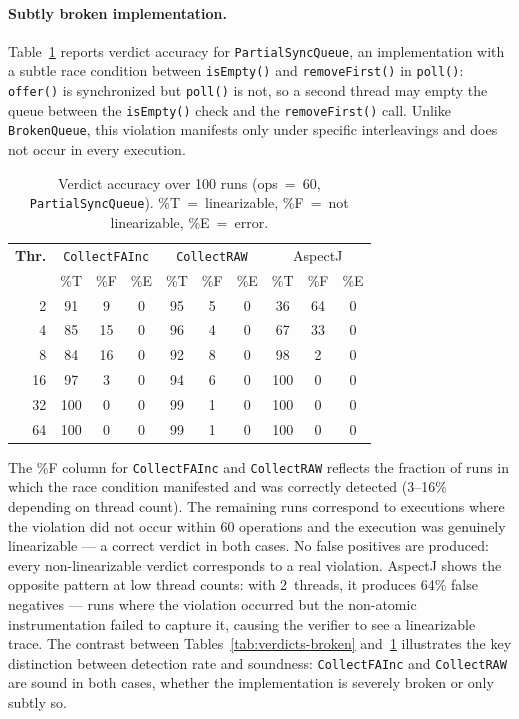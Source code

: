 \documentclass[preprint,12pt]{elsarticle}
\begin{document}
\paragraph{Subtly broken implementation.}
Table~\ref{tab:verdicts-partial} reports verdict accuracy for
\texttt{PartialSyncQueue}, an implementation with a subtle race
condition between \texttt{isEmpty()} and \texttt{removeFirst()} in
\texttt{poll()}: \texttt{offer()} is synchronized but \texttt{poll()}
is not, so a second thread may empty the queue between the
\texttt{isEmpty()} check and the \texttt{removeFirst()} call.
Unlike \texttt{BrokenQueue}, this violation manifests only under
specific interleavings and does not occur in every execution.

\begin{table}[h!]
\centering
\scriptsize
\caption{Verdict accuracy over 100 runs (ops~=~60,
         \texttt{PartialSyncQueue}).
         \%T~=~linearizable, \%F~=~not linearizable, \%E~=~error.}
\label{tab:verdicts-partial}
\begin{tabular}{rccccccccc}
\hline
\textbf{Thr.}
  & \multicolumn{3}{c}{\texttt{CollectFAInc}}
  & \multicolumn{3}{c}{\texttt{CollectRAW}}
  & \multicolumn{3}{c}{AspectJ} \\
  & \%T & \%F & \%E & \%T & \%F & \%E & \%T & \%F & \%E \\
\hline
 2 & 91 &  9 & 0 & 95 &  5 & 0 & 36 & 64 & 0 \\
 4 & 85 & 15 & 0 & 96 &  4 & 0 & 67 & 33 & 0 \\
 8 & 84 & 16 & 0 & 92 &  8 & 0 & 98 &  2 & 0 \\
16 & 97 &  3 & 0 & 94 &  6 & 0 &100 &  0 & 0 \\
32 &100 &  0 & 0 & 99 &  1 & 0 &100 &  0 & 0 \\
64 &100 &  0 & 0 & 99 &  1 & 0 &100 &  0 & 0 \\
\hline
\end{tabular}
\end{table}

The \%F column for \texttt{CollectFAInc} and \texttt{CollectRAW}
reflects the fraction of runs in which the race condition manifested
and was correctly detected (3--16\% depending on thread count). The
remaining runs correspond to executions where the violation did not
occur within 60 operations and the execution was genuinely
linearizable --- a correct verdict in both cases. No false positives
are produced: every non-linearizable verdict corresponds to a real
violation. AspectJ shows the opposite pattern at low thread counts:
with 2~threads, it produces 64\% false negatives --- runs where the
violation occurred but the non-atomic instrumentation failed to capture
it, causing the verifier to see a linearizable trace. The contrast
between Tables~\ref{tab:verdicts-broken} and~\ref{tab:verdicts-partial}
illustrates the key distinction between detection rate and soundness:
\texttt{CollectFAInc} and \texttt{CollectRAW} are sound in both cases,
whether the implementation is severely broken or only subtly so.
\end{document}
